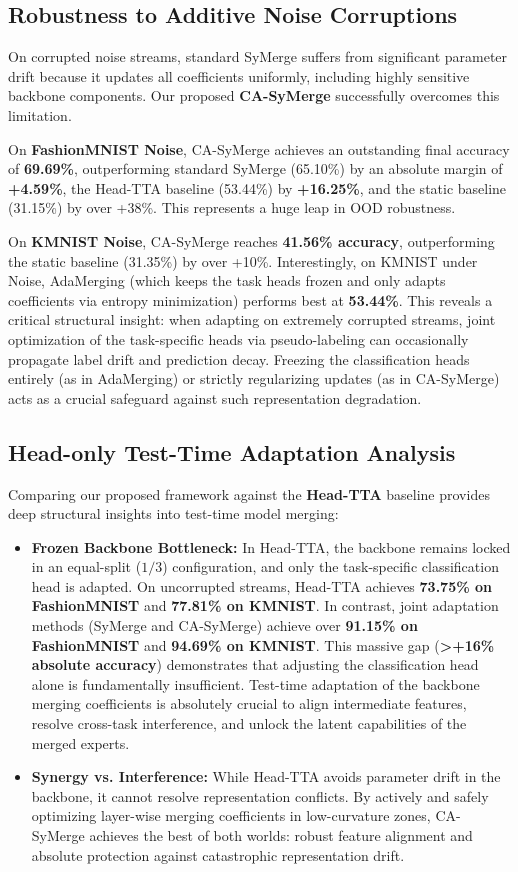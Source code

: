 \documentclass{article}
\begin{document}
\subsection{Robustness to Additive Noise Corruptions}
On corrupted noise streams, standard SyMerge suffers from significant parameter drift because it updates all coefficients uniformly, including highly sensitive backbone components. Our proposed \textbf{CA-SyMerge} successfully overcomes this limitation.

On \textbf{FashionMNIST Noise}, CA-SyMerge achieves an outstanding final accuracy of \textbf{69.69\%}, outperforming standard SyMerge (65.10\%) by an absolute margin of \textbf{+4.59\%}, the Head-TTA baseline (53.44\%) by \textbf{+16.25\%}, and the static baseline (31.15\%) by over +38\%. This represents a huge leap in OOD robustness.

On \textbf{KMNIST Noise}, CA-SyMerge reaches \textbf{41.56\% accuracy}, outperforming the static baseline (31.35\%) by over +10\%. Interestingly, on KMNIST under Noise, AdaMerging (which keeps the task heads frozen and only adapts coefficients via entropy minimization) performs best at \textbf{53.44\%}. This reveals a critical structural insight: when adapting on extremely corrupted streams, joint optimization of the task-specific heads via pseudo-labeling can occasionally propagate label drift and prediction decay. Freezing the classification heads entirely (as in AdaMerging) or strictly regularizing updates (as in CA-SyMerge) acts as a crucial safeguard against such representation degradation.

\subsection{Head-only Test-Time Adaptation Analysis}
Comparing our proposed framework against the \textbf{Head-TTA} baseline provides deep structural insights into test-time model merging:
\begin{itemize}\itemsep=0pt\parsep=0pt\topsep=2pt
    \item \textbf{Frozen Backbone Bottleneck:} In Head-TTA, the backbone remains locked in an equal-split ($1/3$) configuration, and only the task-specific classification head is adapted. On uncorrupted streams, Head-TTA achieves \textbf{73.75\% on FashionMNIST} and \textbf{77.81\% on KMNIST}. In contrast, joint adaptation methods (SyMerge and CA-SyMerge) achieve over \textbf{91.15\% on FashionMNIST} and \textbf{94.69\% on KMNIST}. This massive gap (\textbf{>+16\% absolute accuracy}) demonstrates that adjusting the classification head alone is fundamentally insufficient. Test-time adaptation of the backbone merging coefficients is absolutely crucial to align intermediate features, resolve cross-task interference, and unlock the latent capabilities of the merged experts.
    \item \textbf{Synergy vs. Interference:} While Head-TTA avoids parameter drift in the backbone, it cannot resolve representation conflicts. By actively and safely optimizing layer-wise merging coefficients in low-curvature zones, CA-SyMerge achieves the best of both worlds: robust feature alignment and absolute protection against catastrophic representation drift.
\end{itemize}
\end{document}
